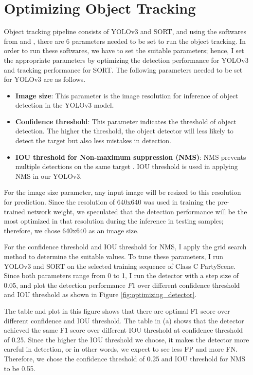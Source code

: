 \section{Optimizing Object Tracking}
\label{sec:methods/section_b}

Object tracking pipeline consists of YOLOv3 and SORT, and using the softwares from \cite{jocher_ultralyticsyolov3_2021} and \cite{abewley_abewleysort_2021}, there are 6 parameters needed to be set to run the object tracking. In order to run these softwares, we have to set the suitable parameters; hence, I set the appropriate parameters by optimizing the detection performance for YOLOv3 and tracking performance for SORT. The following parameters needed to be set for YOLOv3 are as follows.
\begin{itemize}
    \item \textbf{Image size}: This parameter is the image resolution for inference of object detection in the YOLOv3 model.
    \item \textbf{Confidence threshold}: This parameter indicates the threshold of object detection. The higher the threshold, the object detector will less likely to detect the target but also less mistakes in detection.
    \item \textbf{IOU threshold for Non-maximum suppression (NMS)}: NMS prevents multiple detections on the same target \cite{redmon_you_2016}. IOU threshold is used in applying NMS in our YOLOv3.
\end{itemize}
For the image size parameter, any input image will be resized to this resolution for prediction. Since the resolution of 640x640 was used in training the pre-trained network weight, we speculated that the detection performance will be the most optimized in that resolution during the inference in testing samples; therefore, we chose 640x640 as an image size.

For the confidence threshold and IOU threshold for NMS, I apply the grid search method to determine the suitable values. To tune these parameters, I run YOLOv3 and SORT on the selected training sequence of Class C PartyScene. Since both parameters range from 0 to 1, I run the detector with a step size of 0.05, and plot the detection performance $F1$ over different confidence threshold and IOU threshold as shown in Figure \ref{fig:optimizing_detector}.

The table and plot in this figure shows that there are optimal F1 score over different confidence and IOU threshold. The table in (a) shows that the detector achieved the same F1 score over different IOU threshold at confidence threshold of 0.25. Since the higher the IOU threshold we choose, it makes the detector more careful in detection, or in other words, we expect to see less FP and more FN. Therefore, we chose the confidence threshold of 0.25 and IOU threshold for NMS to be 0.55.

